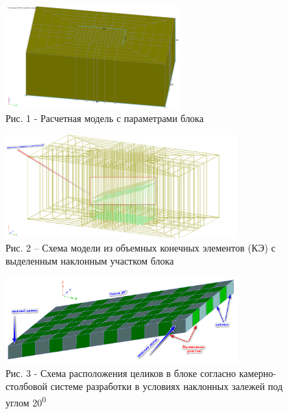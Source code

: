 \begin{figure}[H]
	\centering
	\includegraphics[width=0.6\textwidth]{media/gor/image6}
	\caption*{Рис. 1 - Расчетная модель с параметрами блока}
\end{figure}



\begin{figure}[H]
	\centering
	\includegraphics[width=0.8\textwidth]{media/gor/image7}
	\caption*{Рис. 2 -- Схема модели из объемных конечных элементов (КЭ) с
	выделенным наклонным участком блока}
\end{figure}



\begin{figure}[H]
	\centering
	\includegraphics[width=0.8\textwidth]{media/gor/image8}
	\caption*{Рис. 3 - Схема расположения целиков в блоке согласно
	камерно-столбовой системе разработки в условиях наклонных залежей под
	углом 20\textsuperscript{0}}
\end{figure}


